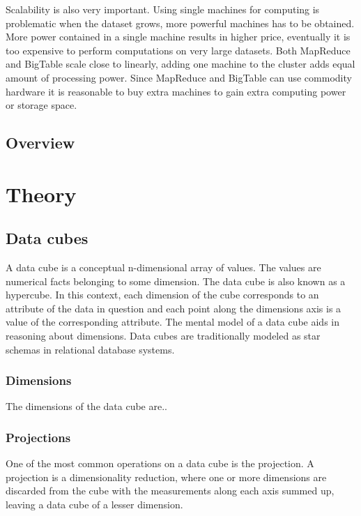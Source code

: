 \documentclass[a4paper,10pt]{book}
\begin{document}
Scalability is also very important. Using single machines for computing is
problematic when the dataset grows, more powerful machines has to be
obtained. More power contained in a single machine results in higher price,
eventually it is too expensive to perform computations on very large
datasets. Both MapReduce and BigTable scale close to linearly, adding one
machine to the cluster adds equal amount of processing power. Since
MapReduce and BigTable can use commodity hardware it is reasonable to buy
extra machines to gain extra computing power or storage space.


\section{Overview}




\chapter{Theory}

\section{Data cubes}

A data cube is a conceptual n-dimensional array of values. The values are numerical facts belonging to some dimension. The data cube is also known as a hypercube. In this context, each dimension of the cube corresponds to an attribute of the data in question and each point along the dimensions axis is a value of the corresponding attribute. The mental model of a data cube aids in reasoning about dimensions. Data cubes are traditionally modeled as star schemas in relational database systems.

\subsection{Dimensions}

The dimensions of the data cube are.. 

\subsection{Projections}

One of the most common operations on a data cube is the projection. A projection is a dimensionality reduction, where one or more dimensions are discarded from the cube with the measurements along each axis summed up, leaving a data cube of a lesser dimension.
\end{document}
